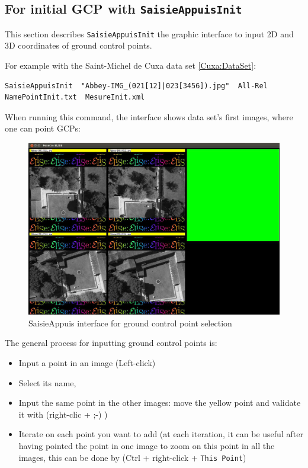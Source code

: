 \subsection{For initial GCP  with {\tt SaisieAppuisInit}}
\label{SaisieAppuisInit}

This section describes {\tt SaisieAppuisInit} the graphic interface to input 2D and 3D coordinates of ground control points.

For example with the Saint-Michel de Cuxa data set \ref{Cuxa:DataSet}:

\begin{verbatim}
SaisieAppuisInit  "Abbey-IMG_(021[12]|023[3456]).jpg"  All-Rel  NamePointInit.txt  MesureInit.xml
\end{verbatim}

When running this command, the interface shows data set's first images, where one can point GCPs:

\begin{figure}[H]
\begin{center}
\includegraphics[width=150mm]{FIGS/Saisie/interface.jpg}
\end{center}
\caption{SaisieAppuis interface for ground control point selection}
\label{FIG:SaisieAppuis:interface}
\end{figure}

The general process for inputting ground control points is:
\begin{itemize}
\item Input a point in an image (Left-click)
\item Select its name,
\item Input the same point in the other images: move the yellow point and validate it with (right-clic + ;-) )
\item Iterate on each point you want to add (at each iteration, it can be useful after having pointed the point in one image to zoom on this point in all the images,
this can be done by (Ctrl + right-click + {\tt This Point})
\end{itemize}

